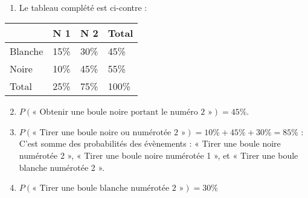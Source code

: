 \documentclass[11pt]{article}
\begin{document}
\begin{exercice}[Tableau]~
  \begin{multicols}{2}
  \begin{enumerate}
    \item Le tableau complété est ci-contre :
  \end{enumerate}

  \columnbreak

  \begin{center}
  \begin{tabular}{p{1.2cm}|p{0.8cm}|p{0.8cm}|p{0.9cm}}
  & N\up{o} 1 & N\up{o} 2 & Total \\
  \hline
  Blanche & 15\% & 30\% & 45\% \\
  \hline
  Noire   & 10\% & 45\% & 55\% \\
  \hline
  Total   & 25\% & 75\% & 100\%\\
\end{tabular}
\end{center}
\end{multicols}
\begin{enumerate}
    \setcounter{enumi}{1}
  \item $P(\text{« Obtenir une boule noire portant le numéro 2 »})=45\%$.
  \item $P(\text{«~Tirer une boule noire ou numérotée 2~»})=10\%+45\%+30\%=85\%$ : C'est somme des probabilités des évènements : « Tirer une boule noire numérotée 2 », « Tirer une boule noire numérotée 1 », et « Tirer une boule blanche numérotée 2 ».
  \item $P(\text{« Tirer une boule blanche numérotée 2 »})=30\%$
  \end{enumerate}
\end{exercice}
\end{document}
